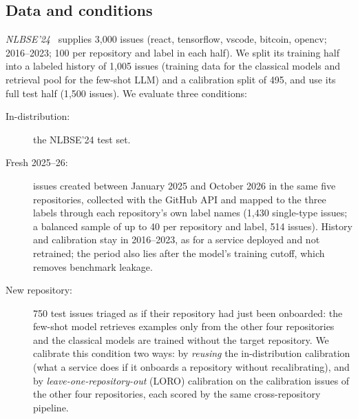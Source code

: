 \subsection{Data and conditions}
\emph{NLBSE'24}~\cite{nlbse24} supplies 3{,}000 issues (react, tensorflow, vscode, bitcoin,
opencv; 2016--2023; 100 per repository and label in each half). We split its training half into a
labeled history of 1{,}005 issues (training data for the classical models and retrieval pool for the
few-shot LLM) and a calibration split of 495, and use its full test half (1{,}500 issues). We
evaluate three conditions:
\begin{description}
\item[In-distribution:] the NLBSE'24 test set.
\item[Fresh 2025--26:] issues created between January 2025 and October 2026 in the same five
repositories, collected with the GitHub API and mapped to the three labels through each repository's
own label names (1{,}430 single-type issues; a balanced sample of up to 40 per repository and label,
514 issues). History and calibration stay in 2016--2023, as for a service deployed and not
retrained; the period also lies after the model's training cutoff, which removes benchmark leakage.
\item[New repository:] 750 test issues triaged as if their repository had just been onboarded: the
few-shot model retrieves examples only from the other four repositories and the classical models are
trained without the target repository. We calibrate this condition two ways: by \emph{reusing} the
in-distribution calibration (what a service does if it onboards a repository without recalibrating),
and by \emph{leave-one-repository-out} (LORO) calibration on the calibration issues of the other four
repositories, each scored by the same cross-repository pipeline.
\end{description}


